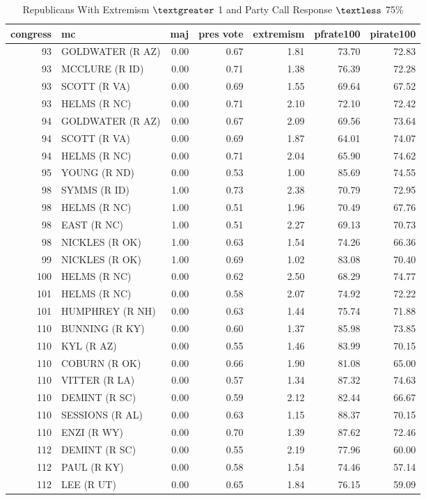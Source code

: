 \documentclass[12pt]{article}
\begin{document}
\begin{table}[ht]
	\centering
	\caption{Republicans With Extremism $ \textgreater $ 1 and Party Call Response $ \textless $ 75\%}
	\begin{tabular}{rlrrrrr}
		\hline
		congress & mc & maj & pres vote & extremism & pfrate100 & pirate100 \\ 
		\hline
		93 & GOLDWATER (R AZ) & 0.00 & 0.67 & 1.81 & 73.70 & 72.83 \\ 
		93 & MCCLURE (R ID) & 0.00 & 0.71 & 1.38 & 76.39 & 72.28 \\ 
		93 & SCOTT (R VA) & 0.00 & 0.69 & 1.55 & 69.64 & 67.52 \\ 
		93 & HELMS (R NC) & 0.00 & 0.71 & 2.10 & 72.10 & 72.42 \\ 
		94 & GOLDWATER (R AZ) & 0.00 & 0.67 & 2.09 & 69.56 & 73.64 \\ 
		94 & SCOTT (R VA) & 0.00 & 0.69 & 1.87 & 64.01 & 74.07 \\ 
		94 & HELMS (R NC) & 0.00 & 0.71 & 2.04 & 65.90 & 74.62 \\ 
		95 & YOUNG (R ND) & 0.00 & 0.53 & 1.00 & 85.69 & 74.55 \\ 
		98 & SYMMS (R ID) & 1.00 & 0.73 & 2.38 & 70.79 & 72.95 \\ 
		98 & HELMS (R NC) & 1.00 & 0.51 & 1.96 & 70.49 & 67.76 \\ 
		98 & EAST (R NC) & 1.00 & 0.51 & 2.27 & 69.13 & 70.73 \\ 
		98 & NICKLES (R OK) & 1.00 & 0.63 & 1.54 & 74.26 & 66.36 \\ 
		99 & NICKLES (R OK) & 1.00 & 0.69 & 1.02 & 83.08 & 70.40 \\ 
		100 & HELMS (R NC) & 0.00 & 0.62 & 2.50 & 68.29 & 74.77 \\ 
		101 & HELMS (R NC) & 0.00 & 0.58 & 2.07 & 74.92 & 72.22 \\ 
		101 & HUMPHREY (R NH) & 0.00 & 0.63 & 1.44 & 75.74 & 71.88 \\ 
		110 & BUNNING (R KY) & 0.00 & 0.60 & 1.37 & 85.98 & 73.85 \\ 
		110 & KYL (R AZ) & 0.00 & 0.55 & 1.46 & 83.99 & 70.15 \\ 
		110 & COBURN (R OK) & 0.00 & 0.66 & 1.90 & 81.08 & 65.00 \\ 
		110 & VITTER (R LA) & 0.00 & 0.57 & 1.34 & 87.32 & 74.63 \\ 
		110 & DEMINT (R SC) & 0.00 & 0.59 & 2.12 & 82.44 & 66.67 \\ 
		110 & SESSIONS (R AL) & 0.00 & 0.63 & 1.15 & 88.37 & 70.15 \\ 
		110 & ENZI (R WY) & 0.00 & 0.70 & 1.39 & 87.62 & 72.46 \\ 
		112 & DEMINT (R SC) & 0.00 & 0.55 & 2.19 & 77.96 & 60.00 \\ 
		112 & PAUL (R KY) & 0.00 & 0.58 & 1.54 & 74.46 & 57.14 \\ 
		112 & LEE (R UT) & 0.00 & 0.65 & 1.84 & 76.15 & 59.09 \\ 
		\hline
	\end{tabular}
\end{table}
\end{document}
